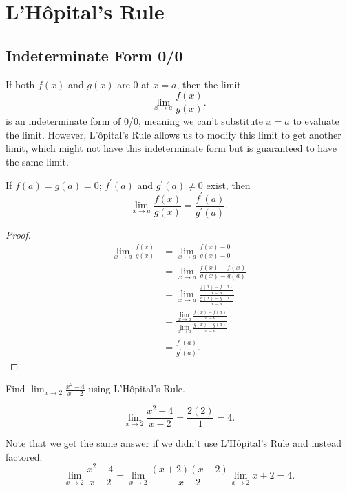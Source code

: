 \section{L'H\^{o}pital's Rule}
\subsection{Indeterminate Form 0/0}
If both $f(x)$ and $g(x)$ are 0 at $x=a$, then the limit
\begin{equation*}
	\lim_{x\to a}{\frac{f(x)}{g(x)}}.
\end{equation*}
is an indeterminate form of 0/0, meaning we can't substitute $x=a$ to evaluate the limit.
However, L'\^{o}pital's Rule allows us to modify this limit to get another limit, which might not have this indeterminate form but is guaranteed to have the same limit.

\begin{theorem}
	If $f(a) = g(a) = 0$; $f^\prime(a)$ and $g^\prime(a) \neq 0$ exist, then
	\begin{equation*}
		\lim_{x\to a}{\frac{f(x)}{g(x)}} = \frac{f^\prime(a)}{g^\prime(a)}.
	\end{equation*}
\end{theorem}
\begin{proof}
	\begin{align*}
		\lim_{x\to a}{\frac{f(x)}{g(x)}} &= \lim_{x\to a}{\frac{f(x)-0}{g(x)-0}} \\
		&= \lim_{x\to a}{\frac{f(x)-f(x)}{g(x)-g(a)}} \\
		&= \lim_{x\to a}{\frac{\frac{f(x)-f(a)}{x-a}}{\frac{g(x)-g(a)}{x-a}}} \\
		&= \frac{\lim_{x\to a}{\frac{f(x)-f(a)}{x-a}}}{\lim_{x\to a}{\frac{g(x)-g(a)}{x-a}}} \\
		&= \frac{f^\prime(a)}{g^\prime(a)}.
	\end{align*}
\end{proof}

\begin{example}
	Find $\lim_{x\to 2}{\frac{x^2-4}{x-2}}$ using L'H\^{o}pital's Rule.
\end{example}
\begin{answer}
	\begin{equation*}
		\lim_{x\to 2}{\frac{x^2-4}{x-2}} = \frac{2(2)}{1} = 4.
	\end{equation*}
	
	Note that we get the same answer if we didn't use L'H\^{o}pital's Rule and instead factored.
	\begin{equation*}
		\lim_{x\to 2}{\frac{x^2-4}{x-2}} = \lim_{x\to 2}{\frac{(x+2)(x-2)}{x-2}} \lim_{x\to 2}{x+2} = 4.
	\end{equation*}
\end{answer}


